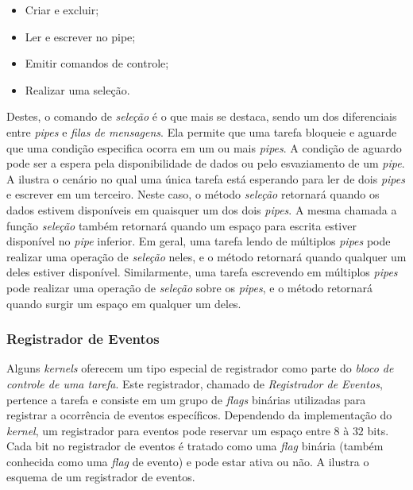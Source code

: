 \begin{itemize}
	\item Criar e excluir;
	\item Ler e escrever no pipe;
	\item Emitir comandos de controle;
	\item Realizar uma seleção.
\end{itemize}

Destes, o comando de \emph{seleção} é o que mais se destaca, sendo um dos diferenciais entre \emph{pipes} e \emph{filas de mensagens}. Ela permite que uma tarefa bloqueie e aguarde que uma condição especifica ocorra em um ou mais \emph{pipes}. A condição de aguardo pode ser a espera pela disponibilidade de dados ou pelo esvaziamento de um \emph{pipe}. A  ilustra o cenário no qual uma única tarefa está esperando para ler de dois \emph{pipes} e escrever em um terceiro. Neste caso, o método \emph{seleção} retornará quando os dados estivem disponíveis em quaisquer um dos dois \emph{pipes}. A mesma chamada a função \emph{seleção} também retornará quando um espaço para escrita estiver disponível no \emph{pipe} inferior. Em geral, uma tarefa lendo de múltiplos \emph{pipes} pode realizar uma operação de \emph{seleção} neles, e o método retornará quando qualquer um deles estiver disponível. Similarmente, uma tarefa escrevendo em múltiplos \emph{pipes} pode realizar uma operação de \emph{seleção} sobre os \emph{pipes}, e o método retornará quando surgir um espaço em qualquer um deles.


\subsubsection{Registrador de Eventos}

Alguns \emph{kernels} oferecem um tipo especial de registrador como parte do \emph{bloco de controle de uma tarefa}. Este registrador, chamado de \emph{Registrador de Eventos}, pertence a tarefa e consiste em um grupo de \emph{flags} binárias utilizadas para registrar a ocorrência de eventos específicos. Dependendo da implementação do \emph{kernel}, um registrador para eventos pode reservar um espaço entre $8$ à $32$ bits. Cada bit no registrador de eventos é tratado como uma \emph{flag} binária (também conhecida como uma \emph{flag} de evento) e pode estar ativa ou não. A  ilustra o esquema de um registrador de eventos.

